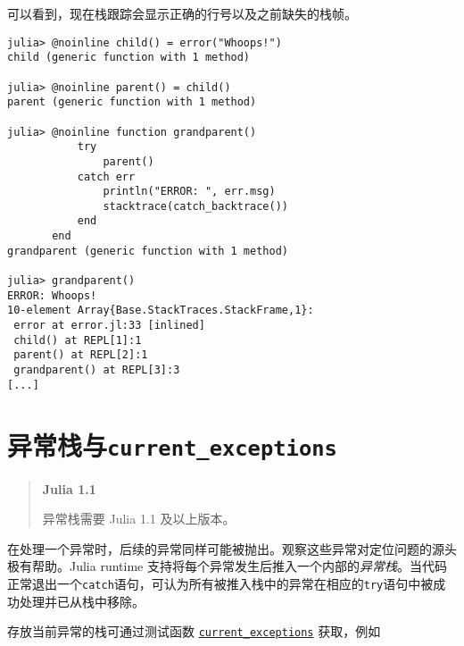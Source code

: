 可以看到，现在栈跟踪会显示正确的行号以及之前缺失的栈帧。




\begin{verbatim}
julia> @noinline child() = error("Whoops!")
child (generic function with 1 method)

julia> @noinline parent() = child()
parent (generic function with 1 method)

julia> @noinline function grandparent()
           try
               parent()
           catch err
               println("ERROR: ", err.msg)
               stacktrace(catch_backtrace())
           end
       end
grandparent (generic function with 1 method)

julia> grandparent()
ERROR: Whoops!
10-element Array{Base.StackTraces.StackFrame,1}:
 error at error.jl:33 [inlined]
 child() at REPL[1]:1
 parent() at REPL[2]:1
 grandparent() at REPL[3]:3
[...]
\end{verbatim}



\hypertarget{11436331555895367891}{}


\section{异常栈与\texttt{current\_exceptions}}



\begin{quote}
\textbf{Julia 1.1}

异常栈需要 Julia 1.1 及以上版本。

\end{quote}


在处理一个异常时，后续的异常同样可能被抛出。观察这些异常对定位问题的源头极有帮助。Julia runtime 支持将每个异常发生后推入一个内部的\emph{异常栈}。当代码正常退出一个\texttt{catch}语句，可认为所有被推入栈中的异常在相应的\texttt{try}语句中被成功处理并已从栈中移除。



存放当前异常的栈可通过测试函数 \href{@ref}{\texttt{current\_exceptions}} 获取，例如




